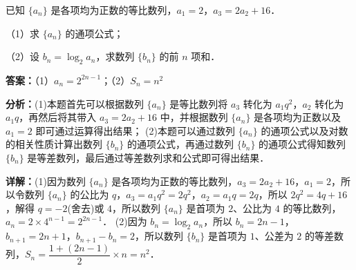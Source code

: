 \begin{question}[points=12]
已知 $\{a_n\}$ 是各项均为正数的等比数列，$a_1=2$，$a_3=2a_2+16$．

（1）求 $\{a_n\}$ 的通项公式；

（2）设 $b_n=\log_2 a_n$，求数列 $\{b_n\}$ 的前 $n$ 项和．
\begin{solution}
\textbf{答案：}（1）$a_n=2^{2n-1}$；（2）$S_n=n^2$

\textbf{分析：}(1)本题首先可以根据数列 $\{a_n\}$ 是等比数列将 $a_3$ 转化为 $a_1q^2$，$a_2$ 转化为 $a_1q$，再然后将其带入 $a_3=2a_2+16$ 中，并根据数列 $\{a_n\}$ 是各项均为正数以及 $a_1=2$ 即可通过运算得出结果；
(2)本题可以通过数列 $\{a_n\}$ 的通项公式以及对数的相关性质计算出数列 $\{b_n\}$ 的通项公式，再通过数列 $\{b_n\}$ 的通项公式得知数列 $\{b_n\}$ 是等差数列，最后通过等差数列求和公式即可得出结果．

\textbf{详解：}(1)因为数列 $\{a_n\}$ 是各项均为正数的等比数列，$a_3=2a_2+16$，$a_1=2$，所以令数列 $\{a_n\}$ 的公比为 $q$，$a_3=a_1q^2=2q^2$，$a_2=a_1q=2q$，所以 $2q^2=4q+16$，解得 $q=-2$(舍去)或 $4$，所以数列 $\{a_n\}$ 是首项为 $2$、公比为 $4$ 的等比数列，$a_n=2\times4^{n-1}=2^{2n-1}$．
(2)因为 $b_n=\log_2 a_n$，所以 $b_n=2n-1$，$b_{n+1}=2n+1$，$b_{n+1}-b_n=2$，所以数列 $\{b_n\}$ 是首项为 $1$、公差为 $2$ 的等差数列，$S_n=\dfrac{1+(2n-1)}{2}\times n=n^2$．
\end{solution}
\end{question}

